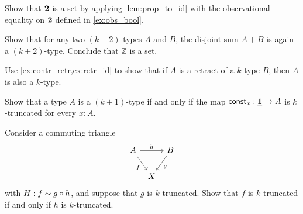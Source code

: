 \begin{exercises}
\begin{subexenum}
\end{subexenum}
\item \label{ex:eq_bool}Show that $\mathbf{2}$ is a set by applying \cref{lem:prop_to_id} with the observational equality on $\mathbf{2}$ defined in \cref{ex:obs_bool}.
\item \label{ex:set_coprod}Show that for any two $(k+2)$-types $A$ and $B$, the disjoint sum $A+B$ is again a $(k+2)$-type. Conclude that $\mathbb{Z}$ is a set.
\item Use \cref{ex:contr_retr,ex:retr_id} to show that if $A$ is a retract of a $k$-type $B$, then $A$ is also a $k$-type.
\item Show that a type $A$ is a $(k+1)$-type if and only if the map $\mathsf{const}_x:\underline{\mathbf{1}}\to A$ is $k$-truncated for every $x:A$.
\item Consider a commuting triangle
\begin{equation*}
\begin{tikzcd}[column sep=tiny]
A \arrow[rr,"h"] \arrow[dr,swap,"f"] & & B \arrow[dl,"g"] \\
& X
\end{tikzcd}
\end{equation*}
with $H: f \sim g \circ h$, and suppose that $g$ is $k$-truncated. Show that $f$ is $k$-truncated if and only if $h$ is $k$-truncated.
\end{exercises}
